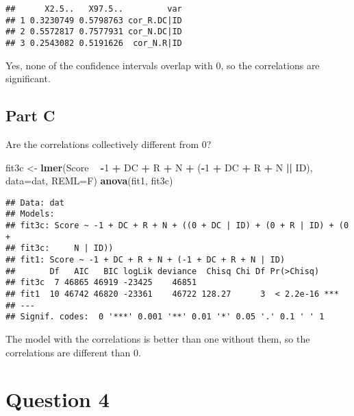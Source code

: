 \documentclass[]{article}
\newenvironment{Shaded}{\begin{snugshade}}{\end{snugshade}}
\newcommand{\KeywordTok}[1]{\textcolor[rgb]{0.13,0.29,0.53}{\textbf{#1}}}
\newcommand{\DataTypeTok}[1]{\textcolor[rgb]{0.13,0.29,0.53}{#1}}
\newcommand{\DecValTok}[1]{\textcolor[rgb]{0.00,0.00,0.81}{#1}}
\newcommand{\StringTok}[1]{\textcolor[rgb]{0.31,0.60,0.02}{#1}}
\newcommand{\OperatorTok}[1]{\textcolor[rgb]{0.81,0.36,0.00}{\textbf{#1}}}
\newcommand{\NormalTok}[1]{#1}
\begin{document}
\begin{verbatim}
##      X2.5..   X97.5..         var
## 1 0.3230749 0.5798763 cor_R.DC|ID
## 2 0.5572817 0.7577931 cor_N.DC|ID
## 3 0.2543082 0.5191626  cor_N.R|ID
\end{verbatim}

Yes, none of the confidence intervals overlap with 0, so the
correlations are significant.

\subsection{Part C}\label{part-c}

Are the correlations collectively different from 0?

\begin{Shaded}
\begin{Highlighting}[]
\NormalTok{fit3c <-}\StringTok{ }\KeywordTok{lmer}\NormalTok{(Score }\OperatorTok{~}\StringTok{ }\OperatorTok{-}\DecValTok{1} \OperatorTok{+}\StringTok{ }\NormalTok{DC }\OperatorTok{+}\StringTok{ }\NormalTok{R }\OperatorTok{+}\StringTok{ }\NormalTok{N }\OperatorTok{+}\StringTok{ }
\StringTok{                 }\NormalTok{(}\OperatorTok{-}\DecValTok{1} \OperatorTok{+}\StringTok{ }\NormalTok{DC }\OperatorTok{+}\StringTok{ }\NormalTok{R }\OperatorTok{+}\StringTok{ }\NormalTok{N }\OperatorTok{||}\StringTok{ }\NormalTok{ID), }\DataTypeTok{data=}\NormalTok{dat,}
                 \DataTypeTok{REML=}\NormalTok{F)}
\KeywordTok{anova}\NormalTok{(fit1, fit3c)}
\end{Highlighting}
\end{Shaded}

\begin{verbatim}
## Data: dat
## Models:
## fit3c: Score ~ -1 + DC + R + N + ((0 + DC | ID) + (0 + R | ID) + (0 + 
## fit3c:     N | ID))
## fit1: Score ~ -1 + DC + R + N + (-1 + DC + R + N | ID)
##       Df   AIC   BIC logLik deviance  Chisq Chi Df Pr(>Chisq)    
## fit3c  7 46865 46919 -23425    46851                             
## fit1  10 46742 46820 -23361    46722 128.27      3  < 2.2e-16 ***
## ---
## Signif. codes:  0 '***' 0.001 '**' 0.01 '*' 0.05 '.' 0.1 ' ' 1
\end{verbatim}

The model with the correlations is better than one without them, so the
correlations are different than 0.

\section{Question 4}\label{question-4}
\end{document}
